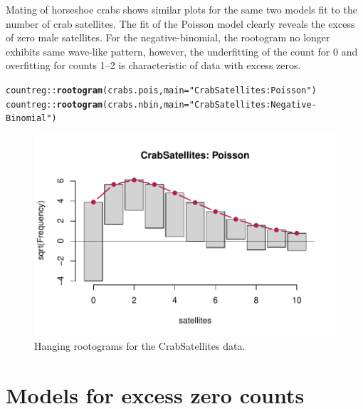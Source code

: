 \documentclass[11pt]{book}\usepackage[]{graphicx}\usepackage[]{color}
\makeatletter
\newcommand{\hlstr}[1]{\textcolor[rgb]{0.192,0.494,0.8}{#1}}%
\newcommand{\hlstd}[1]{\textcolor[rgb]{0.345,0.345,0.345}{#1}}%
\newcommand{\hlkwc}[1]{\textcolor[rgb]{0.333,0.667,0.333}{#1}}%
\newcommand{\hlkwd}[1]{\textcolor[rgb]{0.737,0.353,0.396}{\textbf{#1}}}%
\newenvironment{kframe}{%
 \def\at@end@of@kframe{}%
 \ifinner\ifhmode%
  \def\at@end@of@kframe{\end{minipage}}%
  \begin{minipage}{\columnwidth}%
 \fi\fi%
 \def\FrameCommand##1{\hskip\@totalleftmargin \hskip-\fboxsep
 \colorbox{shadecolor}{##1}\hskip-\fboxsep
     \hskip-\linewidth \hskip-\@totalleftmargin \hskip\columnwidth}%
 \MakeFramed {\advance\hsize-\width
   \@totalleftmargin\z@ \linewidth\hsize
   \@setminipage}}%
 {\par\unskip\endMakeFramed%
 \at@end@of@kframe}
\newenvironment{knitrout}{}{} %
\renewenvironment{knitrout}{\small\renewcommand{\baselinestretch}{.85}}{} %
\makeatother
\begin{document}
\begin{Example}[crabs2]{Mating of horseshoe crabs}
 shows similar plots for the same two models fit to the number of
crab satellites.  The fit of the Poisson model clearly reveals the excess of zero male satellites.
For the negative-binomial, the rootogram no longer exhibits same wave-like pattern, 
however, the underfitting of the count for 0 and overfitting for counts 1--2 is 
characteristic of data with excess zeros.

\begin{knitrout}
\color{fgcolor}\begin{kframe}
\begin{alltt}
\hlstd{countreg::}\hlkwd{rootogram}\hlstd{(crabs.pois,} \hlkwc{main}\hlstd{=}\hlstr{"CrabSatellites: Poisson"}\hlstd{)}
\hlstd{countreg::}\hlkwd{rootogram}\hlstd{(crabs.nbin,} \hlkwc{main}\hlstd{=}\hlstr{"CrabSatellites: Negative-Binomial"}\hlstd{)}
\end{alltt}


{\ttfamily\noindent\bfseries\color{errorcolor}{\#\# Error: object 'crabs.nbin' not found}}\end{kframe}\begin{figure}[!htbp]


\centerline{\includegraphics[width=.49\textwidth]{ch09/fig/crabs2-rootogram} }

\caption[Hanging rootograms for the CrabSatellites data]{Hanging rootograms for the CrabSatellites data.\label{fig:crabs2-rootogram}}
\end{figure}


\end{knitrout}
\end{Example}



\section{Models for excess zero counts}\label{sec:glm-zeros}
\end{document}
